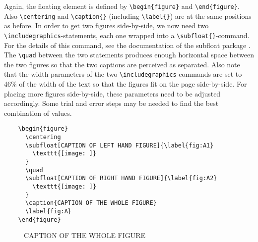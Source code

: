 \documentclass[a4paper,twoside]{article}
\begin{document}
Again, the floating element is defined by \verb|\begin{figure}| and \verb|\end{figure}|. Also \verb|\centering| and \verb|\caption{}| (including \verb|\label{}|) are at the same positions as before. In order to get two figures side-by-side, we now need two \verb|\includegraphics|-statements, each one wrapped into a \verb|\subfloat{}|-command. For the details of this command, see the documentation of the subfloat package \citep{subfloat}. The \verb|\quad| between the two statements produces enough horizontal space between the two figures so that the two captions are perceived as separated. Also note that the width parameters of the two \verb|\includegraphics|-commands are set to 46\% of the width of the text so that the figures fit on the page side-by-side. For placing more figures side-by-side, these parameters need to be adjusted accordingly. Some trial and error steps may be needed to find the best combination of values.


\begin{verbatim}
    \begin{figure}
      \centering
      \subfloat[CAPTION OF LEFT HAND FIGURE]{\label{fig:A1}
        \texttt{[image: ]}
      } 
      \quad
      \subfloat[CAPTION OF RIGHT HAND FIGURE]{\label{fig:A2}
        \texttt{[image: ]}
      }
      \caption{CAPTION OF THE WHOLE FIGURE}
      \label{fig:A}
    \end{figure}
\end{verbatim}

\begin{figure}
\centering
{} 
\quad
{}
\caption{CAPTION OF THE WHOLE FIGURE}
\end{figure}
\end{document}
